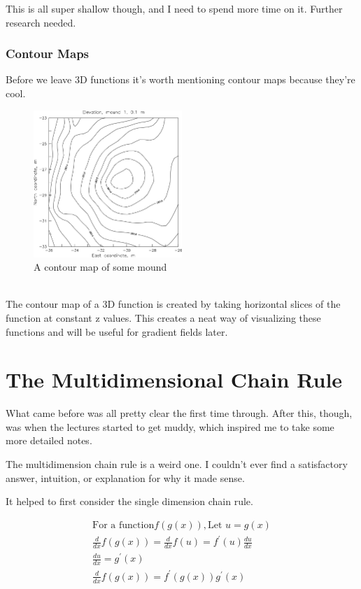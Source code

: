 \documentclass[12pt, letterpaper]{article}
\begin{document}
This is all super shallow though, and I need to spend more time on it. Further research needed.
\subsubsection{Contour Maps}
\label{sssec:Contour Maps}
Before we leave 3D functions it's worth mentioning contour maps because they're cool.\\
\begin{figure}[h]
    \centering 
    \includegraphics[width=0.5\textwidth]{contourmap}
    \caption{A contour map of some mound}
\end{figure}\\
The contour map of a 3D function is created by taking horizontal slices of the function at constant z values. This creates a neat way of visualizing these functions and will be useful for gradient fields later.

\newpage

\section{The Multidimensional Chain Rule}
What came before was all pretty clear the first time through. After this, though, was when the lectures started to get muddy, which inspired me to take some more detailed notes.

The multidimension chain rule is a weird one. I couldn't ever find a satisfactory answer, intuition, or explanation for why it made sense.

It helped to first consider the single dimension chain rule.

\begin{gather*}
    \text{For a function} f(g(x)), \text{Let } u = g(x) \\
    \frac{d}{dx} f(g(x)) = \frac{d}{dx} f(u) = f^\prime (u)\frac{du}{dx}\\
    \frac{du}{dx} = g^\prime (x)\\
    \frac{d}{dx} f(g(x)) = f^\prime (g(x)) g^\prime (x)
\end{gather*}
\end{document}
